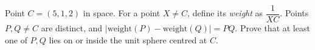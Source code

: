 Point $C=(5,1,2)$ in space. For a point $X\ne C$, define its \emph{weight} as $\dfrac1{XC}$. Points $P,Q\ne C$ are distinct, and $|\text{weight}(P)-\text{weight}(Q)|=PQ$. Prove that at least one of $P,Q$ lies on or inside the unit sphere centred at $C$.

